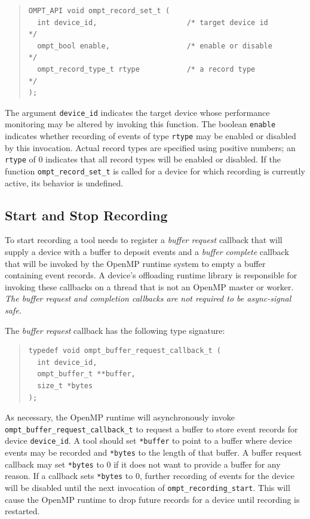\documentclass{article}
\begin{document}
\begin{quote}
\begin{verbatim}
OMPT_API void ompt_record_set_t (
  int device_id,                     /* target device id          */
  ompt_bool enable,                  /* enable or disable         */
  ompt_record_type_t rtype           /* a record type             */
);
\end{verbatim}
\end{quote}
The argument \verb|device_id| indicates the target device whose performance monitoring may be altered by invoking this function. The boolean \verb|enable| indicates whether recording of events of type \verb|rtype| may be enabled or disabled by this invocation.
Actual record types are specified using positive numbers; an \verb|rtype| of  0 indicates that all record types will be enabled or disabled.
If the function \verb|ompt_record_set_t| is called for a device for which recording is currently active, its behavior is undefined.

\subsection{Start and Stop Recording}
\label{sec:start-stop-recording}

To start recording a tool needs to register a \emph{buffer request} callback that will supply a device with a buffer to deposit events and a \emph{buffer complete} callback that will be invoked by the OpenMP runtime system to empty a buffer containing event records. A device's offloading runtime library is responsible for invoking these callbacks on a thread that is not an OpenMP master or worker. {\em The buffer request and completion callbacks are not required to  be async-signal safe.}

The \emph{buffer request} callback has the following type signature:
\begin{quote}
\begin{verbatim}
typedef void ompt_buffer_request_callback_t (
  int device_id,
  ompt_buffer_t **buffer,
  size_t *bytes
);
\end{verbatim}
\end{quote}
As necessary, the OpenMP runtime will asynchronously invoke \verb|ompt_buffer_request_callback_t| to request a buffer to store event records for device \verb|device_id|.
A tool should set \verb|*buffer| to point to a buffer where device events may be recorded and \verb|*bytes| to the length of that buffer.
A buffer request callback  may set \verb|*bytes| to 0 if it does not want to provide a buffer for any reason. If a callback sets \verb|*bytes| to 0, further recording of events for the device will be disabled until the next invocation of \verb|ompt_recording_start|. This will cause the OpenMP runtime to drop future records for a device until recording is restarted.
\end{document}
